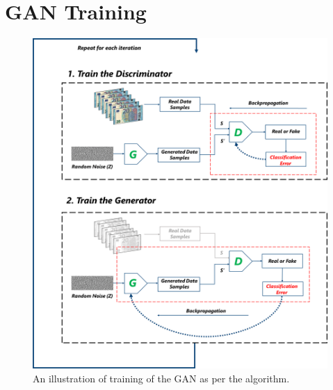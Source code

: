 \section{\ac{GAN} Training}
\vspace*{1.5cm}
\begin{figure}[H]
    \begin{center}
	\includegraphics[scale=0.25]{images/Appendix/generatorAndDiscriminatorTraining.png}
	\caption[An illustration of training of the \ac{GAN} as per the algorithm.]{An illustration of training of the \ac{GAN} as per the algorithm.}
	\label{fig:generatorAndDiscriminatorTraining}
	\end{center}
\end{figure}



